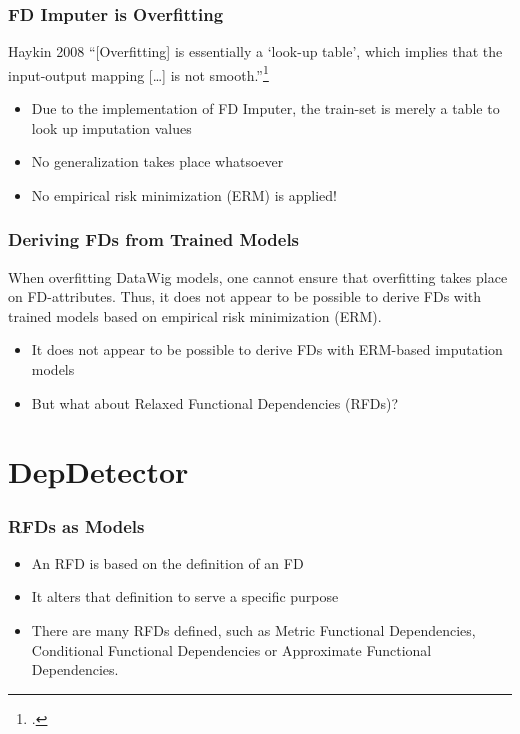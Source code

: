 \documentclass{beamer}
\begin{document}
\begin{frame}
    \frametitle{FD Imputer is Overfitting}
    \begin{block}{Haykin 2008}
        ``[Overfitting] is essentially a `look-up table', which implies that the input-output mapping [\dots] is not smooth.''\footcite[p.~165]{HAY08}
    \end{block}
    \pause
    \begin{itemize}
        \item Due to the implementation of FD Imputer, the train-set is merely a table to look up imputation values
        \item No generalization takes place whatsoever
        \item No empirical risk minimization (ERM) is applied!
    \end{itemize}
\end{frame}

\begin{frame}
    \frametitle{Deriving FDs from Trained Models}
 When overfitting DataWig models, one cannot ensure that overfitting takes place on FD-attributes. Thus, it does not appear to be possible to derive FDs with trained models based on empirical risk minimization (ERM).
    \begin{itemize}
        \item It does not appear to be possible to derive FDs with ERM-based imputation models
        \item But what about Relaxed Functional Dependencies (RFDs)?
    \end{itemize}
\end{frame}

\section{DepDetector}
\begin{frame}
    \frametitle{RFDs as Models}
    \begin{itemize}
        \item An RFD is based on the definition of an FD
        \item It alters that definition to serve a specific purpose
        \item There are many RFDs defined, such as Metric Functional Dependencies, Conditional Functional Dependencies or Approximate Functional Dependencies.
    \end{itemize}
\end{frame}
\end{document}
